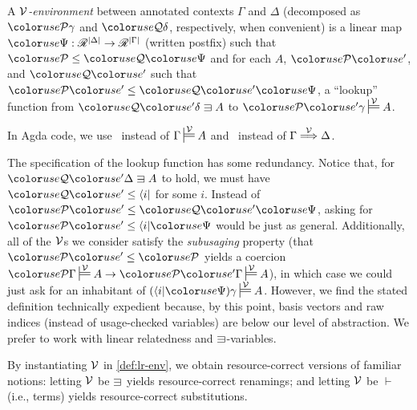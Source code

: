 
\begin{definition}[Environment]\label{def:lr-env}
  A \emph{$\mathcal V$-environment} between annotated contexts $\Gamma$ and
  $\Delta$ (decomposed as $\grP\gamma$ and $\grQ\delta$, respectively,
  when convenient) is a linear map
  $\gr\Psi : \Ann^{\size\Delta} \to \Ann^{\size\Gamma}$ (written
  postfix) such that $\grP \leq \grQ\gr\Psi$ and for each $A$,
  $\grPprime$, and $\grQprime$ such that
  $\grPprime \leq \grQprime\gr\Psi$, a ``lookup'' function from
  $\grQprime\delta \sqni A$ to $\grPprime\gamma \sdtstile{}\V A$.
\end{definition}

In Agda code, we use \ instead of
$\Gamma \sdtstile{}\V A$ and \ instead of
$\Gamma \stackrel{\mathcal V}\Longrightarrow \Delta$.

The specification of the lookup function has some redundancy.
Notice that, for $\grQprime\Delta \sqni A$ to hold, we must have
$\grQprime \leq \langle i \rvert$ for some $i$.
Instead of $\grPprime \leq \grQprime\gr\Psi$, asking for
$\grPprime \leq \langle i \rvert\gr\Psi$ would be just as general.
Additionally, all of the $\mathcal V$s we consider satisfy the \emph{subusaging}
property (that $\grPprime \leq \grP$ yields a coercion
$\grP\Gamma \sdtstile{}\V A \to \grPprime\Gamma \sdtstile{}\V A$), in which case
we could just ask for an inhabitant of
$\plr{\langle i \rvert\gr\Psi}\gamma \sdtstile{}\V A$.
However, we find the stated definition technically expedient because, by this
point, basis vectors and raw indices (instead of usage-checked variables) are
below our level of abstraction.
We prefer to work with linear relatedness and $\sqni$-variables.

By instantiating $\mathcal V$ in \cref{def:lr-env}, we obtain resource-correct versions
of familiar
notions: letting $\mathcal V$ be $\sqni$ yields resource-correct renamings;
and letting $\mathcal V$ be $\vdash$ (i.e., terms) yields resource-correct
substitutions.

